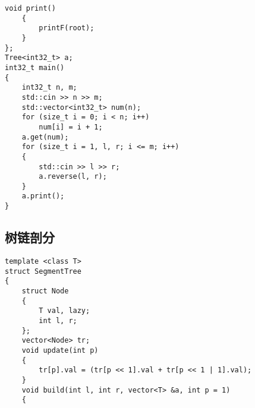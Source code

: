 \documentclass{ctexbook}  %
\begin{document}
\begin{Verbatim}[fontsize=\small]
    void print()
    {
        printF(root);
    }
};
Tree<int32_t> a;
int32_t main()
{
    int32_t n, m;
    std::cin >> n >> m;
    std::vector<int32_t> num(n);
    for (size_t i = 0; i < n; i++)
        num[i] = i + 1;
    a.get(num);
    for (size_t i = 1, l, r; i <= m; i++)
    {
        std::cin >> l >> r;
        a.reverse(l, r);
    }
    a.print();
}
\end{Verbatim}

\subsection{树链剖分}
\lstset{basicstyle=	tfamily}
\begin{Verbatim}[fontsize=\small]
template <class T>
struct SegmentTree
{
    struct Node
    {
        T val, lazy;
        int l, r;
    };
    vector<Node> tr;
    void update(int p)
    {
        tr[p].val = (tr[p << 1].val + tr[p << 1 | 1].val);
    }
    void build(int l, int r, vector<T> &a, int p = 1)
    {


\end{Verbatim}
\end{document}
